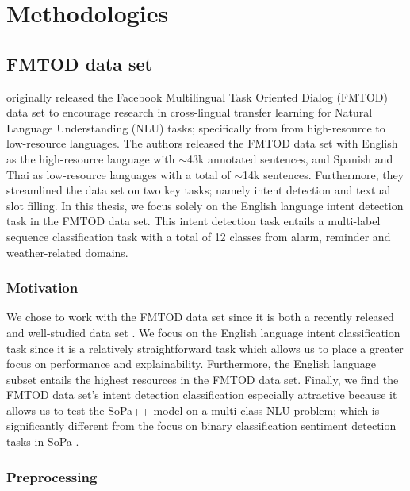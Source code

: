 \chapter{Methodologies}

\label{chapter:methodologies}

\section{FMTOD data set}

\citet{schuster-etal-2019-cross-lingual} originally released the Facebook Multilingual Task Oriented Dialog (FMTOD) data set to encourage research in cross-lingual transfer learning for Natural Language Understanding (NLU) tasks; specifically from from high-resource to low-resource languages. The authors released the FMTOD data set with English as the high-resource language with $\sim$43k annotated sentences, and Spanish and Thai as low-resource languages with a total of $\sim$14k sentences. Furthermore, they streamlined the data set on two key tasks; namely intent detection and textual slot filling. In this thesis, we focus solely on the English language intent detection task in the FMTOD data set. This intent detection task entails a multi-label sequence classification task with a total of 12 classes from alarm, reminder and weather-related domains.

\subsection{Motivation}

We chose to work with the FMTOD data set since it is both a recently released and well-studied data set \citep{schuster-etal-2019-cross-lingual,zhang2019joint,zhang2020intent,ren2020intention}. We focus on the English language intent classification task since it is a relatively straightforward task which allows us to place a greater focus on performance and explainability. Furthermore, the English language subset entails the highest resources in the FMTOD data set. Finally, we find the FMTOD data set's intent detection classification especially attractive because it allows us to test the SoPa++ model on a multi-class NLU problem; which is significantly different from the focus on binary classification sentiment detection tasks in SoPa \citep{schwartz2018sopa}.

\subsection{Preprocessing}

